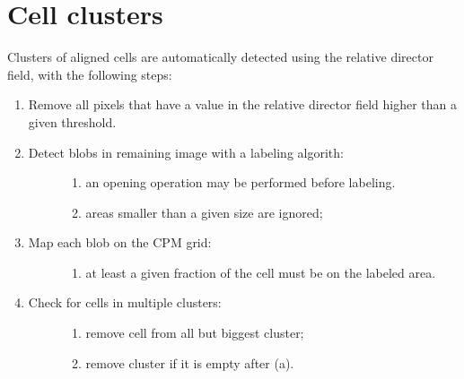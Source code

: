 \documentclass[letterpaper,10pt,english]{sphinxmanual}
\begin{document}
\section{Cell clusters}
\label{AnalysisUtils:cell-clusters}
Clusters of aligned cells are automatically detected using the relative director field, with the following steps:
\begin{enumerate}
\item {} 
Remove all pixels that have a value in the relative director field higher than a given threshold.

\item {} \begin{description}
\item[{Detect blobs in remaining image with a labeling algorith:}] \leavevmode\begin{enumerate}
\item {} 
an opening operation may be performed before labeling.

\item {} 
areas smaller than a given size are ignored;

\end{enumerate}

\end{description}

\item {} \begin{description}
\item[{Map each blob on the CPM grid:}] \leavevmode\begin{enumerate}
\item {} 
at least a given fraction of the cell must be on the labeled area.

\end{enumerate}

\end{description}

\item {} \begin{description}
\item[{Check for cells in multiple clusters:}] \leavevmode\begin{enumerate}
\item {} 
remove cell from all but biggest cluster;

\item {} 
remove cluster if it is empty after (a).

\end{enumerate}

\end{description}

\end{enumerate}
\end{document}
